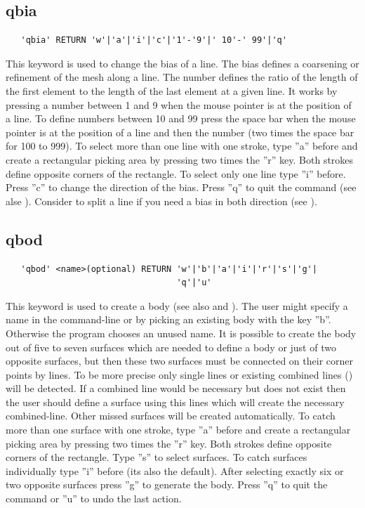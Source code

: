 \documentclass{article}
\begin{document}
\subsection{\label{qbia}qbia}
\begin{verbatim}
   'qbia' RETURN 'w'|'a'|'i'|'c'|'1'-'9'|' 10'-' 99'|'q' 
\end{verbatim}
This keyword is used to change the bias of a line. The bias defines a coarsening or refinement of the mesh along a line. The number defines the ratio of the length of the first element to the length of the last element at a given line. It works by pressing a number between 1 and 9 when the mouse pointer is at the position of a line. To define numbers between 10 and 99 press the space bar when the mouse pointer is at the position of a line and then the number (two times the space bar for 100 to 999). To select more than one line with one stroke, type ''a'' before and create a rectangular picking area by pressing two times the ''r'' key. Both strokes define opposite corners of the rectangle. To select only one line type ''i'' before. Press ''c'' to change the direction of the bias. Press ''q'' to quit the command (see alse ). Consider to split a line if you need a bias in both direction (see ).

\subsection{\label{qbod}qbod}
\begin{verbatim}
   'qbod' <name>(optional) RETURN 'w'|'b'|'a'|'i'|'r'|'s'|'g'|
                                  'q'|'u'
\end{verbatim}
This keyword is used to create a body (see also  and ). The user might specify a name in the command-line or by picking an existing body with the key ''b''. Otherwise the program chooses an unused name. It is possible to create the body out of five to seven surfaces which are needed to define a body or just of two opposite surfaces, but then these two surfaces must be connected on their corner points by lines. To be more precise only single lines or existing combined lines () will be detected. If a combined line would be necessary but does not exist then the user should define a surface using this lines which will create the necessary combined-line. Other missed surfaces will be created automatically. To catch more than one surface with one stroke, type ''a'' before and create a rectangular picking area by pressing two times the ''r'' key. Both strokes define opposite corners of the rectangle. Type ''s'' to select surfaces. To catch surfaces individually type ''i'' before (its also the default). After selecting exactly six or two opposite surfaces press ''g'' to generate the body. Press ''q'' to quit the command or ''u'' to undo the last action.
\end{document}
